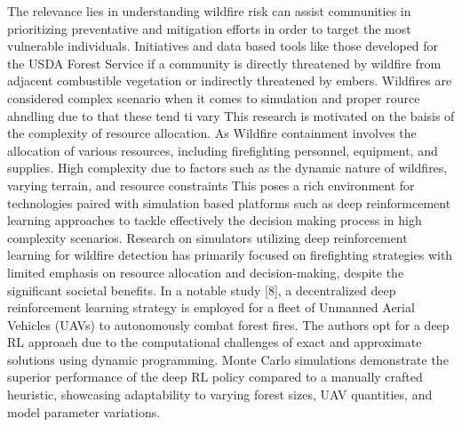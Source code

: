 \documentclass[lettersize,journal]{IEEEtran}
\begin{document}
The relevance lies in understanding wildfire risk can assist communities in prioritizing preventative and mitigation efforts in order to target the most vulnerable individuals.
Initiatives and data based tools like those developed for the USDA Forest Service if a community is directly threatened by wildfire from adjacent combustible vegetation or indirectly threatened by embers.
Wildfires are considered complex scenario when it comes to simulation and proper rource ahndling due to that these tend ti vary 
This research is motivated on the baisis of the complexity of resource allocation. As Wildfire containment involves the allocation of various resources, including firefighting personnel, equipment, and supplies. High complexity due to factors such as the dynamic nature of wildfires, varying terrain, and resource constraints
This poses a rich environment for technologies paired with simulation based platforms such as deep reinformcement learning approaches to tackle effectively the decision making process in high complexity scenarios. 
Research on simulators utilizing deep reinforcement learning for wildfire detection has primarily focused on firefighting strategies with limited emphasis on resource allocation and decision-making, despite the significant societal benefits. In a notable study [8], a decentralized deep reinforcement learning strategy is employed for a fleet of Unmanned Aerial Vehicles (UAVs) to autonomously combat forest fires. The authors opt for a deep RL approach due to the computational challenges of exact and approximate solutions using dynamic programming. Monte Carlo simulations demonstrate the superior performance of the deep RL policy compared to a manually crafted heuristic, showcasing adaptability to varying forest sizes, UAV quantities, and model parameter variations.
\end{document}
